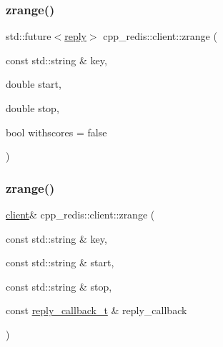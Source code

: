 \subsubsection{\texorpdfstring{zrange()}{zrange()}\hspace{0.1cm}{\footnotesize\ttfamily [6/9]}}
{\footnotesize\ttfamily std\+::future$<$\hyperlink{classcpp__redis_1_1reply}{reply}$>$ cpp\+\_\+redis\+::client\+::zrange (\begin{DoxyParamCaption}\item[{const std\+::string \&}]{key,  }\item[{double}]{start,  }\item[{double}]{stop,  }\item[{bool}]{withscores = {\ttfamily false} }\end{DoxyParamCaption})}

\mbox{\label{classcpp__redis_1_1client_ad24c21a0344652d821d0628c68057ecb}} 
\subsubsection{\texorpdfstring{zrange()}{zrange()}\hspace{0.1cm}{\footnotesize\ttfamily [7/9]}}
{\footnotesize\ttfamily \hyperlink{classcpp__redis_1_1client}{client}\& cpp\+\_\+redis\+::client\+::zrange (\begin{DoxyParamCaption}\item[{const std\+::string \&}]{key,  }\item[{const std\+::string \&}]{start,  }\item[{const std\+::string \&}]{stop,  }\item[{const \hyperlink{classcpp__redis_1_1client_a061a1140d36d2eaeda82b09a0bb3f9f2}{reply\+\_\+callback\+\_\+t} \&}]{reply\+\_\+callback }\end{DoxyParamCaption})}

\mbox{\label{classcpp__redis_1_1client_a3768026508c4c2e28c600bf7be54b4a1}} 
